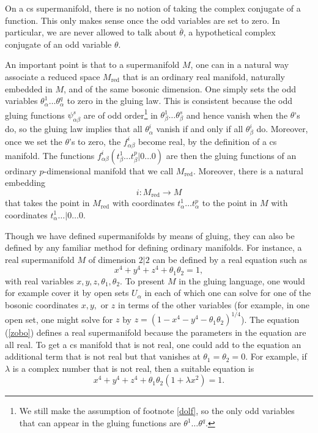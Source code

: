 \documentclass[11pt,a4paper]{article}
\def\red{{\mathrm{red}}}
\def\bar{\overline}
\begin{document}
On a cs supermanifold, there is no notion of taking the complex conjugate of a function.
This only makes sense once the odd variables are set to zero.   In particular, we are never allowed to talk about $\bar \theta$, a hypothetical
complex conjugate of an odd variable $\theta$.

An important point  is that to a supermanifold $M$, one can in a natural way associate a reduced space $M_\red$ that is an ordinary real manifold, naturally embedded in $M$, and of the
same bosonic dimension.
One simply sets the odd variables $\theta^1_\alpha\dots\theta^q_\alpha$ to zero in the gluing law.  This is consistent because the odd gluing functions $\psi^s_{\alpha\beta}$
are of odd order\footnote{We still make the assumption of footnote \ref{dolf}, so the only odd variables that can appear in the gluing functions
are $\theta^1\dots\theta^q$.} in $\theta^1_\beta\dots\theta^s_\beta$ and hence vanish
when the $\theta$'s do, so the gluing law implies that all 
$\theta^i_\alpha$ vanish if and only if all $\theta^i_\beta$ do.  Moreover, once we set the $\theta$'s to zero, the $f^i_{\alpha\beta}$ become real, by the definition of a cs manifold.  
The functions $f^i_{\alpha\beta}(t^1_\beta\dots t^p_\beta|0\dots0)$ are then the gluing functions of an ordinary $p$-dimensional manifold that we call $M_\red$.  Moreover, there is
a natural embedding
\begin{equation}\label{natemb}i:M_\red\to M\end{equation}
that takes the point in $M_\red$ with coordinates $t^1_\alpha\dots t^p_\alpha$ to the point in $M$ with coordinates $t^1_\alpha\dots|0\dots 0$.

Though we have defined supermanifolds by means of gluing, they can also be defined by any familiar method for defining ordinary manifolds.  
For instance, a real supermanifold $M$ of dimension $2|2$ can be defined by a real equation such as
\begin{equation}\label{zobo} x^4+y^4+z^4+\theta_1\theta_2 =1,\end{equation}
with real variables $x,y,z,\theta_1,\theta_2$.   To present $M$ in the gluing language, one would for example cover it by open sets $U_\alpha$ in each of which one can solve
for one of the bosonic coordinates $x,y, $ or $z$ in terms of the other variables (for example, in one open set, one might solve for $z$ by  $z=(1-x^4-y^4-\theta_1\theta_2)^{1/4}$).
The equation (\ref{zobo}) defines a real supermanifold because the parameters in the equation are all real.  To get a cs manifold that is not real, one could
add to the equation an additional term that is not real but that vanishes at $\theta_1=\theta_2=0$.  For example, if $\lambda$ is a complex number that is not real, then a suitable equation is
\begin{equation}\label{obo}x^4+y^4+z^4+\theta_1\theta_2(1+\lambda x^2)=1.\end{equation}
\end{document}
